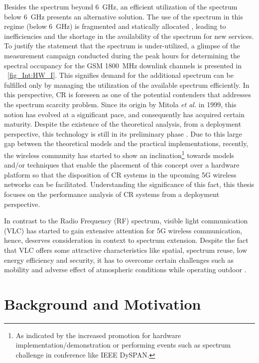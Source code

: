 Besides the spectrum beyond \SI{6}{GHz}, an efficient utilization of the spectrum below \SI{6}{GHz} presents an alternative solution. The use of the spectrum in this regime (below \SI{6}{GHz}) is fragmented and statically allocated \cite{Mchen05, Mchen07}, leading to inefficiencies and the shortage in the availability of the spectrum for new services. To justify the statement that the spectrum is under-utilized, a glimpse of the measurement campaign conducted during the peak hours for determining the spectral occupancy for the GSM \SI{1800}{MHz} downlink channels is presented in \figurename~\ref{fig_Int:HW_I}. This signifies demand for the additional spectrum can be fulfilled only by managing the utilization of the available spectrum efficiently. In this perspective, CR is foreseen as one of the potential contenders that addresses the spectrum scarcity problem. Since its origin by Mitola \textit{et al.} in 1999, this notion has evolved at a significant pace, and consequently has acquired certain maturity. Despite the existence of the theoretical analysis, from a deployment perspective, this technology is still in its preliminary phase \cite{Pawe11}. Due to this large gap between the theoretical models and the practical implementations, recently, the wireless community has started to show an inclination\footnote{As indicated by the increased promotion for hardware implementation/demonstration or performing events such as spectrum challenge in conference like IEEE DySPAN.} towards models and/or techniques that enable the placement of this concept over a hardware platform so that the disposition of CR systems in the upcoming 5G wireless networks can be facilitated. Understanding the significance of this fact, this thesis focuses on the performance analysis of CR systems from a deployment perspective. 

In contrast to the Radio Frequency (RF) spectrum, visible light communication (VLC) has started to gain extensive attention for 5G wireless communication, hence, deserves consideration in context to spectrum extension. Despite the fact that VLC offers some attractive characteristics like spatial, spectrum reuse, low energy efficiency and security, it has to overcome certain challenges such as mobility and adverse effect of atmospheric conditions while operating outdoor \cite{Wu14}. 


\section{Background and Motivation}
\label{sec:mot}

